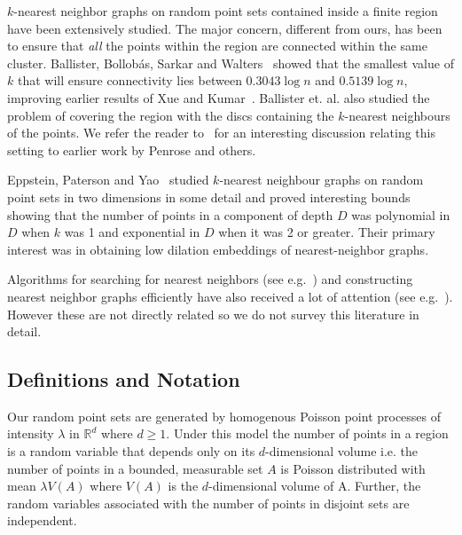 \documentclass[11pt]{article}
\def\RR{\mathbb{R}}
\begin{document}
$k$-nearest neighbor graphs on random point sets contained inside a
finite region have been extensively studied. The major concern,
different from ours, has been to ensure that {\em all} the points
within the region are connected within the same cluster. Ballister,
Bollob\'as, Sarkar and Walters~\cite{ballister-aap:2005} showed that
the smallest value of $k$ that will ensure connectivity lies between
$0.3043 \log n $ and $0.5139 \log n$, improving earlier results of Xue
and Kumar~\cite{xue-wn:2004}. Ballister et. al. also studied the
problem of covering the region with the discs containing the
$k$-nearest neighbours of the points. We refer the reader
to~\cite{ballister-aap:2005} for an interesting discussion relating
this setting to earlier work by Penrose and others.

Eppstein, Paterson and Yao~\cite{eppstein-dcg:1997} studied
$k$-nearest neighbour graphs on random point sets in two dimensions in
some detail and proved interesting bounds showing that the number of
points in a component of depth $D$ was polynomial in $D$ when $k$ was
1 and exponential in $D$ when it was 2 or greater. Their primary
interest was in obtaining low dilation embeddings of nearest-neighbor
graphs.

Algorithms for searching for nearest neighbors (see
e.g.~\cite{clarkson:2005,vaidya-dcg:1989}) and constructing nearest
neighbor graphs efficiently have also received a lot of attention (see
e.g.~\cite{paredes-wea:2006}). However these are not directly related
so we do not survey this literature in detail.


\subsection{Definitions and Notation}
\label{sec:intro:definitions}

 Our random point sets are
generated by homogenous Poisson point processes of intensity $\lambda$
in $\RR^d$ where $d\geq1$. Under this model the number of points in a
region is a random variable that depends only on its $d$-dimensional
volume i.e. the number of points in a bounded, measurable set $A$ is
Poisson distributed with mean $\lambda V(A)$ where $V(A)$ is the
$d$-dimensional volume of A. Further, the random variables associated
with the number of points in disjoint sets are independent.
\end{document}
